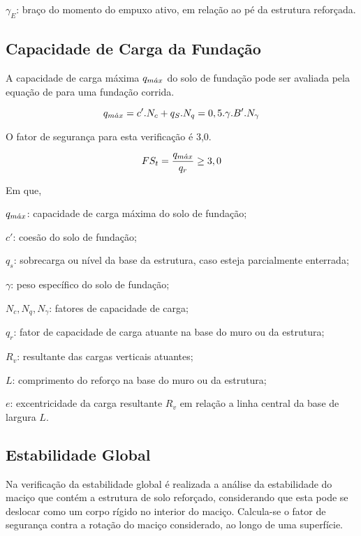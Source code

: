 $\gamma_E$: braço do momento do empuxo ativo, em relação ao pé da estrutura reforçada.
 
 \subsection{Capacidade de Carga da Fundação}
 
 A capacidade de carga máxima $q_{m\Acute{a}x}$ do solo de fundação pode ser avaliada pela equação de  para uma fundação corrida.
 
 \begin{equation}
    q_{m\Acute{a}x} = c' . N_c + q_S . N_q = 0,5 . \gamma . B' . N_\gamma
 \end{equation}
 
 O fator de segurança para esta verificação é 3,0.
 
 \begin{equation}
 FS_t = \frac{q_{m\Acute{a}x}}{q_r} \geq 3,0
 \end{equation}
 
 Em que,
 
 $q_{m\Acute{a}x}$: capacidade de carga máxima do solo de fundação;
 
 $c'$: coesão do solo de fundação;
 
 $q_s$: sobrecarga ou nível da base da estrutura, caso esteja parcialmente enterrada;
 
 $\gamma$: peso específico do solo de fundação;
 
 $N_c, N_q, N_\gamma$: fatores de capacidade de carga;
 
 $q_r$: fator de capacidade de carga atuante na base do muro ou da estrutura;
 
 $R_v$: resultante das cargas verticais atuantes;
 
 $L$: comprimento do reforço na base do muro ou da estrutura;
 
 $e$: excentricidade da carga resultante $R_v$ em relação a linha central da base de largura $L$.
 
 
\subsection{Estabilidade Global}
 
Na verificação da estabilidade global é realizada a análise da estabilidade do maciço que contém a estrutura de solo reforçado, considerando que esta pode se deslocar como um corpo rígido no interior do maciço. Calcula-se o fator de segurança contra a rotação do maciço considerado, ao longo de uma superfície.

